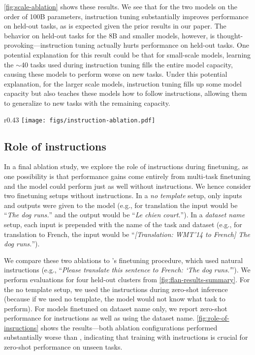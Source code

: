 \cref{fig:scale-ablation} shows these results. 
We see that for the two models on the order of 100B parameters, instruction tuning substantially improves performance on held-out tasks, as is expected given the prior results in our paper.
The behavior on held-out tasks for the 8B and smaller models, however, is thought-provoking---instruction tuning actually hurts performance on held-out tasks. 
One potential explanation for this result could be that for small-scale models, learning the $\sim$40 tasks used during instruction tuning fills the entire model capacity, causing these models to perform worse on new tasks. 
Under this potential explanation, for the larger scale models, instruction tuning fills up some model capacity but also teaches these models how to follow instructions, allowing them to generalize to new tasks with the remaining capacity. 

\begin{wrapfigure}{r}{0.43\textwidth}
    \centering
    \vspace{-6mm}
    \texttt{[image: figs/instruction-ablation.pdf]}
    \vspace{-7mm}
    \caption{
    Ablation study result using models with instructions removed from finetuning (FT). 
    }
    \vspace{-3mm}
    \label{fig:role-of-insructions}
\end{wrapfigure}

\subsection{Role of instructions}\label{subsec:role-of-instructions}
In a final ablation study, we explore the role of instructions during finetuning, as one possibility is that performance gains come entirely from multi-task finetuning and the model could perform just as well without instructions.
We hence consider two finetuning setups without instructions.
In a \textit{no template} setup, only inputs and outputs were given to the model (e.g., for translation the input would be ``\textit{The dog runs.}'' and the output would be ``\textit{Le chien court.}'').
In a \textit{dataset name} setup, each input is prepended with the name of the task and dataset (e.g., for translation to French, the input would be ``\textit{[Translation: WMT'14 to French] The dog runs.}'').

We compare these two ablations to \flan{}'s finetuning procedure, which used natural instructions (e.g., ``\textit{Please translate this sentence to French: `The dog runs.'}'').
We perform evaluations for four held-out clusters from \cref{fig:flan-results-summary}.
For the no template setup, we used the \flan{} instructions during zero-shot inference (because if we used no template, the model would not know what task to perform).
For models finetuned on dataset name only, we report zero-shot performance for \flan{} instructions as well as using the dataset name.
\cref{fig:role-of-insructions} shows the results---both ablation configurations performed substantially worse than \flan{}, indicating that training with instructions is crucial for zero-shot performance on unseen tasks.

